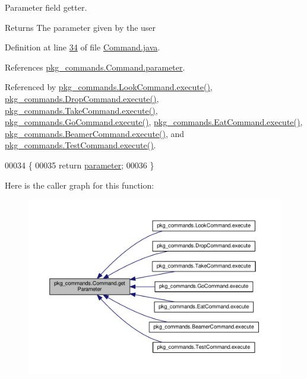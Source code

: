Parameter field getter. 

\begin{DoxyReturn}{Returns}
The parameter given by the user 
\end{DoxyReturn}


Definition at line \hyperlink{Command_8java_source_l00034}{34} of file \hyperlink{Command_8java_source}{Command.\-java}.



References \hyperlink{Command_8java_source_l00021}{pkg\-\_\-commands.\-Command.\-parameter}.



Referenced by \hyperlink{LookCommand_8java_source_l00026}{pkg\-\_\-commands.\-Look\-Command.\-execute()}, \hyperlink{DropCommand_8java_source_l00027}{pkg\-\_\-commands.\-Drop\-Command.\-execute()}, \hyperlink{TakeCommand_8java_source_l00027}{pkg\-\_\-commands.\-Take\-Command.\-execute()}, \hyperlink{GoCommand_8java_source_l00028}{pkg\-\_\-commands.\-Go\-Command.\-execute()}, \hyperlink{EatCommand_8java_source_l00028}{pkg\-\_\-commands.\-Eat\-Command.\-execute()}, \hyperlink{BeamerCommand_8java_source_l00030}{pkg\-\_\-commands.\-Beamer\-Command.\-execute()}, and \hyperlink{TestCommand_8java_source_l00032}{pkg\-\_\-commands.\-Test\-Command.\-execute()}.


\begin{DoxyCode}
00034                                  \{
00035         \textcolor{keywordflow}{return} \hyperlink{classpkg__commands_1_1Command_a089fe1b30b43b2ad5f0dcb2f0ffc2fdd}{parameter};
00036     \}
\end{DoxyCode}


Here is the caller graph for this function\-:\nopagebreak
\begin{figure}[H]
\begin{center}
\leavevmode
\includegraphics[width=350pt]{classpkg__commands_1_1Command_a41c92d445be73ea9d62320c65efb8434_icgraph}
\end{center}
\end{figure}


